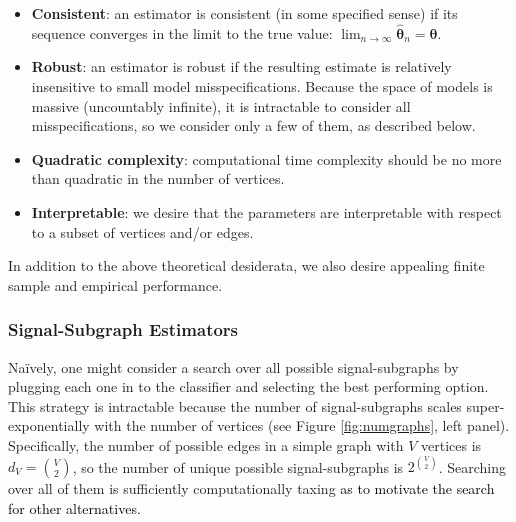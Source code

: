 \documentclass[10pt,journal,cspaper,compsoc]{IEEEtran}
\providecommand{\tk}[1]{\textcolor{black}{#1}}
\providecommand{\ve}[1]{\boldsymbol{#1}}
\newcommand{\bth}{\ve{\theta}}
\newcommand{\bhth}{\wh{\ve{\theta}}}
\providecommand{\mc}[1]{\mathcal{#1}}
\providecommand{\wh}[1]{\widehat{#1}}
\newcommand{\conv}{\rightarrow}
\newcommand{\comment}[1]{}
\begin{document}
\begin{itemize}
	\item \textbf{Consistent}: an estimator is consistent (in some specified sense) if its sequence converges in the limit to the true value: $\lim_{n \conv \infty} \bhth_n = \bth$.  %
	\item \textbf{Robust}: an estimator is robust if the resulting estimate is relatively insensitive to small model misspecifications.  Because the space of models is massive (uncountably infinite), it is intractable to consider all misspecifications, so we consider only a few of them, as described below.
	\item \textbf{Quadratic complexity}: computational time complexity should be no more than quadratic in the number of vertices.
	\item \textbf{Interpretable}: we desire that the parameters are interpretable with respect to a subset of vertices and/or edges.
\end{itemize}
In addition to the above theoretical desiderata, we also desire appealing finite sample and empirical performance.


\subsubsection{Signal-Subgraph Estimators} %
\label{ssub:subsubsection_name1}


Na\"{i}vely, one might consider a search over all possible signal-subgraphs by plugging each one in to the classifier and selecting the best performing option.  This strategy is intractable because the number of signal-subgraphs scales super-exponentially with the number of vertices (see Figure \ref{fig:numgraphs}, left panel). Specifically, the number of possible edges in a simple graph with $V$ vertices is $d_V=\binom{V}{2}$, so the number of unique possible signal-subgraphs is $2^{\binom{V}{2}}$.  Searching over all of them is sufficiently computationally taxing %
\tk{as to motivate the search for other alternatives.}
\comment{We therefore consider several alternatives.}
\end{document}
